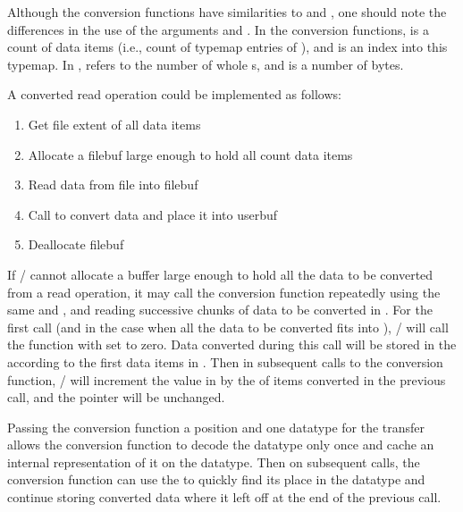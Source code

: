 \begin{users}
Although the conversion functions have similarities
to  and 
,
one should note the differences in the use
of the arguments  and .
In the conversion functions,
 is a count of data items
(i.e., count of typemap entries of ),
and  is an index into this typemap.
In ,
 refers to the number of whole s,
and  is a number of bytes.
\end{users}

\begin{implementors}
A converted read operation could be implemented as follows:

\begin{enumerate}
\item Get file extent of all data items
\item Allocate a filebuf large enough to hold all count data items
\item Read data from file into filebuf
\item Call  to convert data and place it into userbuf
\item Deallocate filebuf
\end{enumerate}
\end{implementors}

If \MPI/ cannot allocate a buffer large enough to hold
all the data to be converted from a read operation, it may
call the conversion function repeatedly using the same 
and ,
and reading successive chunks of data to be
converted in .  For the first call (and in
the case when all the data to be converted fits into
), \MPI/ will call the function with 
 set to zero.  Data converted during this
call will be stored in the  according to
the first  data items in .  Then
in subsequent calls to the conversion function, \MPI/ will
increment the value in  by the  of
items converted in the previous
call, and the  pointer will be unchanged. 

\begin{rationale}
Passing the conversion function a position and one datatype for the transfer
allows the conversion function to decode the datatype only once and
cache an internal representation of it on the datatype.
Then on subsequent calls, the conversion function can use the 
to quickly find its place in the datatype and continue
storing converted data where it left off at the end of the previous call.
\end{rationale}

